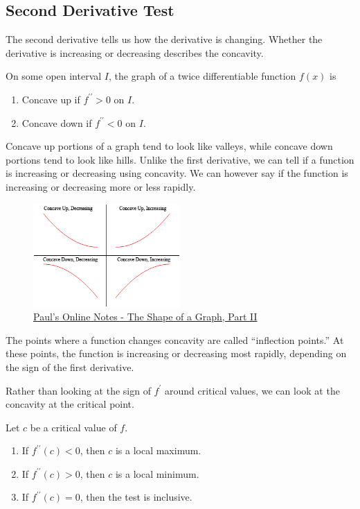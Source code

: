 \subsection{Second Derivative Test}
The second derivative tells us how the derivative is changing.
Whether the derivative is increasing or decreasing describes the concavity.
\begin{definition}
	On some open interval $I$, the graph of a twice differentiable function $f(x)$ is
	\begin{enumerate}
		\item Concave up if $f^{\prime\prime} > 0$ on $I$.
		\item Concave down if $f^{\prime\prime} < 0$ on $I$.
	\end{enumerate}
\end{definition}


Concave up portions of a graph tend to look like valleys, while concave down portions tend to look like hills.
Unlike the first derivative, we can tell if a function is increasing or decreasing using concavity.
We can however say if the function is increasing or decreasing more or less rapidly.

\begin{figure}[H]
	\label{second_derivative_test}
	\centering
	\includegraphics[width = 0.5\textwidth]{./applications_derivative/concavity.png}
	\caption{\hyperref{https://tutorial.math.lamar.edu/classes/calci/shapeofgraphptii.aspx}{}{}{Paul's Online Notes - The Shape of a Graph, Part II}}
\end{figure}


The points where a function changes concavity are called ``inflection points.''
At these points, the function is increasing or decreasing most rapidly, depending on the sign of the first derivative.


Rather than looking at the sign of $f^\prime$ around critical values, we can look at the concavity at the critical point.
\begin{theorem}
	Let $c$ be a critical value of $f$.
	\begin{enumerate}
		\item If $f^{\prime\prime}(c) < 0$, then $c$ is a local maximum.
		\item If $f^{\prime\prime}(c) > 0$, then $c$ is a local minimum.
		\item If $f^{\prime\prime}(c) = 0$, then the test is inclusive.
	\end{enumerate}
\end{theorem}

